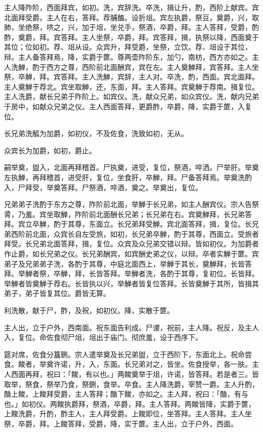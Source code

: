 \documentclass[]{article}
\begin{document}
主人降阼阶，西面拜宾，如初。洗，宾辞洗。卒洗，揖让升，酌，西阶上献宾。宾北面拜受爵。主人在右，答拜。荐脯醢。设折俎。宾左执爵，祭豆，奠爵，兴，取肺，坐绝祭，哜之，兴，加于俎，坐兑手，祭酒，卒爵，拜。主人答拜，受爵，酌酢，奠爵，拜。宾答拜。主人坐祭，卒爵，拜。宾答拜，揖，执祭以降，西面奠于其位；位如初。荐、俎从设。众宾升，拜受爵，坐祭，立饮。荐、俎设于其位，辩。主人备答拜焉，降，实爵于篚。尊两壶阼阶东，加勺，南枋，西方亦如之。主人洗觯，酌于西方之尊，西阶前北面酬宾，宾在左。主人奠觯拜，宾答拜。主人坐祭，卒觯，拜。宾答拜。主人洗觯，宾辞，主人对。卒洗，酌，西面。宾北面拜。主人奠觯于荐北。宾坐取觯，还，东面，拜。主人答拜。宾奠觯于荐南。揖复位。主人洗爵，献长兄弟于阼阶上。如宾仪。洗，献众兄弟，如众宾仪。洗，献内兄弟于房中，如献众兄弟之仪。主人西面答拜，更爵酢，卒爵，降，实爵于篚，入复位。

长兄弟洗觚为加爵，如初仪，不及佐食，洗致如初，无从。

众宾长为加爵，如初，爵止。

嗣举奠，盥入，北面再拜稽首。尸执奠，进受，复位，祭酒，啐洒。尸举肝。举奠左执觯，再拜稽首，进受肝，复位，坐食肝，卒觯，拜。尸备答拜焉。举奠洗酌入，尸拜受，举奠答拜。尸祭酒，啐酒，奠之。举奠出，复位。

兄弟弟子洗酌于东方之尊，阼阶前北面，举觯于长兄弟，如主人酬宾仪。宗人告祭脀，乃羞。宾坐取觯，阼阶前北面酬长兄弟；长兄弟在右。宾奠觯拜，长兄弟答拜。宾立卒觯，酌于其尊，东面立。长兄弟拜受觯。宾北面答拜，揖，复位。长兄弟西阶前北面，众宾长自左受旅，如初，长兄弟卒觯，酌于其尊，西面立。受旅者拜受。长兄弟北面答拜，揖，复位。众宾及众兄弟交错以辩。皆如初仪。为加爵者作止爵，如长兄弟之仪。长兄弟酬宾，如宾酬史弟之仪，以辩。卒者实觯于篚。宾弟子及兄弟弟子洗，各酌于其尊，中庭北面西上，举觯于其长，奠觯拜，长皆答拜。举觯者祭，卒觯，拜，长皆答拜。举觯者洗，各酌于其尊，复初位。长皆拜。举觯者皆奠觯于荐右。长皆执以兴，举觯者皆复位答拜。长皆奠觯于其所，皆揖其弟子，弟子皆复其位。爵皆无算。

利洗散，献于尸，酢，及祝，如初仪。降，实散于篚。

主人出，立于户外，西南面。祝东面告利成。尸谡，祝前，主人降。祝反，及主人入，复位。命佐食彻尸俎，俎出于庙门。彻庶羞，设于西序下。

筵对席，佐食分簋鉶。宗人遣举奠及长兄弟盥，立于西阶下，东面北上。祝命尝食。餕者，举奠许诺，升，入，东面。长兄弟对之，皆坐。佐食授举，各一肤。主人西面再拜，祝曰：「餕，有以也。」两餕奠举于俎，许诺，皆答拜。若是者三。皆取举，祭食，祭举乃食，祭鉶，食举。卒食。主人降洗爵，宰赞一爵。主人升酌，酳上餕，上餕拜受爵，主人答拜；酳下餕，亦如之。主人拜，祝曰：「酳，有与也。」如初仪。两餕执爵拜，祭酒，卒爵，拜。主人答拜。两餕皆降，实爵于篚，上餕洗爵，升酌，酢主人，主人拜受爵。上餕即位，坐答拜。主人答拜。主人坐祭，卒爵，拜。上餕答拜，受爵，降，实于篚。主人出，立于户外，西面。
\end{document}
